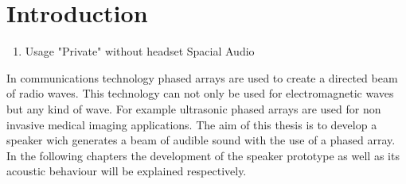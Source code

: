 \chapter{Introduction}

\begin{enumerate}
  \item Usage
  \subitem "Private" without headset
  \subitem Spacial Audio
\end{enumerate}

In communications technology phased arrays are used to create a directed beam of radio waves. This technology can not only be used for electromagnetic waves but any kind of wave. For example ultrasonic phased arrays are used for non invasive medical imaging applications.\p
The aim of this thesis is to develop a speaker wich generates a beam of audible sound with the use of a phased array.
In the following chapters the development of the speaker prototype as well as its acoustic behaviour will be explained respectively.